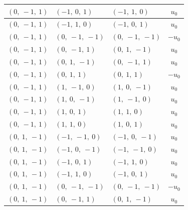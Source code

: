 \documentclass[11pt]{article}
\theoremstyle{definition}
\begin{document}
\begin{longtable}{|l|l|l|c|}
    \hline
    $\left( 0, \  -1, \  1\right)$ & $\left( -1, \  0, \  1\right)$ & $\left( -1, \  1, \  0\right)$ & $u_{0}$ \\
    \hline
    $\left( 0, \  -1, \  1\right)$ & $\left( -1, \  1, \  0\right)$ & $\left( -1, \  0, \  1\right)$ & $u_{0}$ \\
    \hline
    $\left( 0, \  -1, \  1\right)$ & $\left( 0, \  -1, \  -1\right)$ & $\left( 0, \  -1, \  -1\right)$ & $- u_{0}$ \\
    \hline
    $\left( 0, \  -1, \  1\right)$ & $\left( 0, \  -1, \  1\right)$ & $\left( 0, \  1, \  -1\right)$ & $u_{0}$ \\
    \hline
    $\left( 0, \  -1, \  1\right)$ & $\left( 0, \  1, \  -1\right)$ & $\left( 0, \  -1, \  1\right)$ & $u_{0}$ \\
    \hline
    $\left( 0, \  -1, \  1\right)$ & $\left( 0, \  1, \  1\right)$ & $\left( 0, \  1, \  1\right)$ & $- u_{0}$ \\
    \hline
    $\left( 0, \  -1, \  1\right)$ & $\left( 1, \  -1, \  0\right)$ & $\left( 1, \  0, \  -1\right)$ & $u_{0}$ \\
    \hline
    $\left( 0, \  -1, \  1\right)$ & $\left( 1, \  0, \  -1\right)$ & $\left( 1, \  -1, \  0\right)$ & $u_{0}$ \\
    \hline
    $\left( 0, \  -1, \  1\right)$ & $\left( 1, \  0, \  1\right)$ & $\left( 1, \  1, \  0\right)$ & $u_{0}$ \\
    \hline
    $\left( 0, \  -1, \  1\right)$ & $\left( 1, \  1, \  0\right)$ & $\left( 1, \  0, \  1\right)$ & $u_{0}$ \\
    \hline
    $\left( 0, \  1, \  -1\right)$ & $\left( -1, \  -1, \  0\right)$ & $\left( -1, \  0, \  -1\right)$ & $u_{0}$ \\
    \hline
    $\left( 0, \  1, \  -1\right)$ & $\left( -1, \  0, \  -1\right)$ & $\left( -1, \  -1, \  0\right)$ & $u_{0}$ \\
    \hline
    $\left( 0, \  1, \  -1\right)$ & $\left( -1, \  0, \  1\right)$ & $\left( -1, \  1, \  0\right)$ & $u_{0}$ \\
    \hline
    $\left( 0, \  1, \  -1\right)$ & $\left( -1, \  1, \  0\right)$ & $\left( -1, \  0, \  1\right)$ & $u_{0}$ \\
    \hline
    $\left( 0, \  1, \  -1\right)$ & $\left( 0, \  -1, \  -1\right)$ & $\left( 0, \  -1, \  -1\right)$ & $- u_{0}$ \\
    \hline
    $\left( 0, \  1, \  -1\right)$ & $\left( 0, \  -1, \  1\right)$ & $\left( 0, \  1, \  -1\right)$ & $u_{0}$ \\

\end{longtable}
\end{document}
